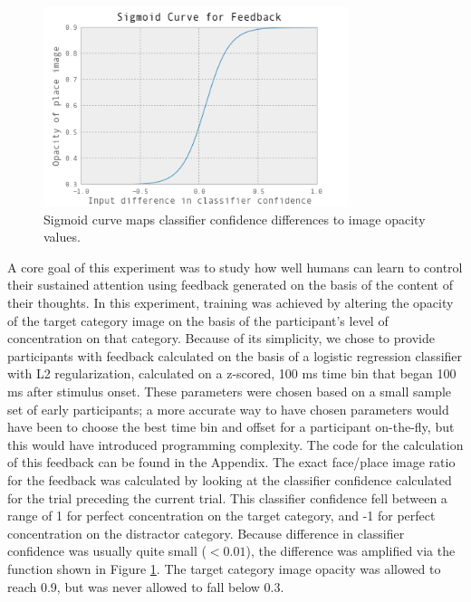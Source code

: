 \documentclass[12pt]{report}
\begin{document}
\begin{figure}
\centering
\includegraphics[width=3.5in]{sigmoidcurve}
\caption{Sigmoid curve maps classifier confidence differences to image opacity values.\label{sigmoid}}
\end{figure}

	A core goal of this experiment was to study how well humans can learn to control their sustained attention using feedback generated on the basis of the content of their thoughts.  In this experiment, training was achieved by altering the opacity of the target category image on the basis of the participant's level of concentration on that category.  Because of its simplicity, we chose to provide participants with feedback calculated on the basis of a logistic regression classifier with L2 regularization, calculated on a z-scored, 100 ms time bin that began 100 ms after stimulus onset.  These parameters were chosen based on a small sample set of early participants; a more accurate way to have chosen parameters would have been to choose the best time bin and offset for a participant on-the-fly, but this would have introduced programming complexity.  The code for the calculation of this feedback can be found in the Appendix.  The exact face/place image ratio for the feedback was calculated by looking at the classifier confidence calculated for the trial preceding the current trial.  This classifier confidence fell between a range of 1 for perfect concentration on the target category, and -1 for perfect concentration on the distractor category.  Because difference in classifier confidence was usually quite small ($< 0.01$), the difference was amplified via the function shown in Figure \ref{sigmoid}.  The target category image opacity was allowed to reach 0.9, but was never allowed to fall below 0.3.  
\end{document}
